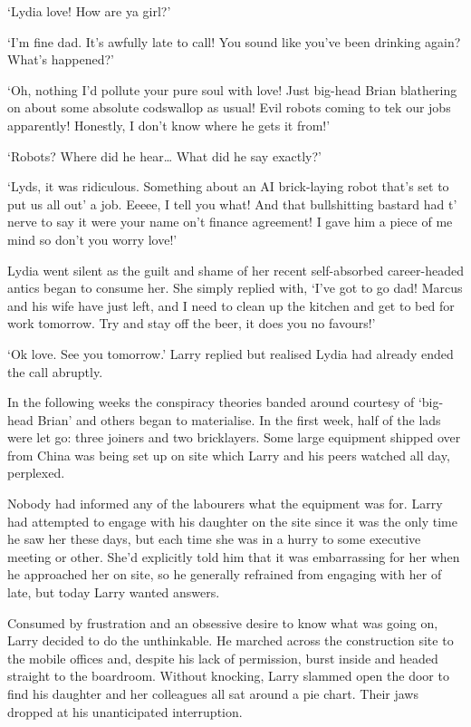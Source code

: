 `Lydia love! How are ya girl?'

`I'm fine dad. It's awfully late to call! You sound like you've been
drinking again? What's happened?'

`Oh, nothing I'd pollute your pure soul with love! Just big-head Brian
blathering on about some absolute codswallop as usual! Evil robots
coming to tek our jobs apparently! Honestly, I don't know where he
gets it from!'

`Robots? Where did he hear… What did he say exactly?'

`Lyds, it was ridiculous. Something about an AI brick-laying robot
that's set to put us all out' a job. Eeeee, I tell you what! And that
bullshitting bastard had t' nerve to say it were your name on't
finance agreement! I gave him a piece of me mind so don't you worry
love!'

Lydia went silent as the guilt and shame of her recent self-absorbed
career-headed antics began to consume her.  She simply replied with,
`I've got to go dad! Marcus and his wife have just left, and I need to
clean up the kitchen and get to bed for work tomorrow. Try and stay
off the beer, it does you no favours!'

`Ok love. See you tomorrow.' Larry replied but realised Lydia had
already ended the call abruptly.

In the following weeks the conspiracy theories banded around courtesy
of `big-head Brian' and others began to materialise. In the first
week, half of the lads were let go: three joiners and two
bricklayers. Some large equipment shipped over from China was being
set up on site which Larry and his peers watched all day, perplexed.

Nobody had informed any of the labourers what the equipment was
for. Larry had attempted to engage with his daughter on the site since
it was the only time he saw her these days, but each time she was in a
hurry to some executive meeting or other. She'd explicitly told him
that it was embarrassing for her when he approached her on site, so he
generally refrained from engaging with her of late, but today Larry
wanted answers.

Consumed by frustration and an obsessive desire to know what was going
on, Larry decided to do the unthinkable.  He marched across the
construction site to the mobile offices and, despite his lack of
permission, burst inside and headed straight to the boardroom. Without
knocking, Larry slammed open the door to find his daughter and her
colleagues all sat around a pie chart. Their jaws dropped at his
unanticipated interruption.

